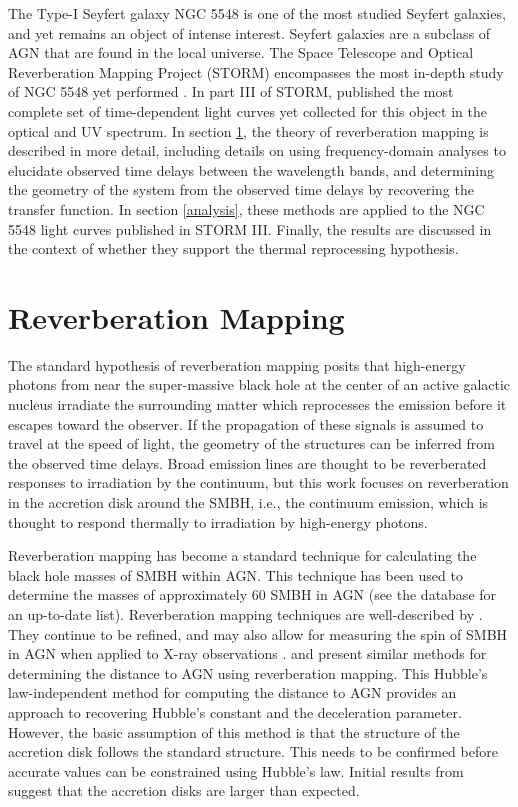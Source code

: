 \documentclass[11pt,letterpaper]{article}
\begin{document}
The Type-I Seyfert galaxy NGC 5548 is one of the most studied Seyfert galaxies, and yet remains an object of intense interest. Seyfert galaxies are a subclass of AGN that are found in the local universe. The Space Telescope and Optical Reverberation Mapping Project (STORM) encompasses the most in-depth study of NGC 5548 yet performed \citep{2015ApJ...806..128D} \citep{2015ApJ...806..129E} \citep{2016ApJ...821...56F}. In part III of STORM, \cite{2016ApJ...821...56F} published the most complete set of time-dependent light curves yet collected for this object in the optical and UV spectrum. In section \ref{sec:reverbmap}, the theory of reverberation mapping is described in more detail, including details on using frequency-domain analyses to elucidate observed time delays between the wavelength bands, and determining the geometry of the system from the observed time delays by recovering the transfer function. In section \ref{analysis}, these methods are applied to the NGC 5548 light curves published in STORM III. Finally, the results are discussed in the context of whether they support the thermal reprocessing hypothesis.


\section{Reverberation Mapping}
\label{sec:reverbmap}

The standard hypothesis of reverberation mapping posits that high-energy photons from near the super-massive black hole at the center of an active galactic nucleus irradiate the surrounding matter which reprocesses the emission before it escapes toward the observer. If the propagation of these signals is assumed to travel at the speed of light, the geometry of the structures can be inferred from the observed time delays. Broad emission lines are thought to be reverberated responses to irradiation by the continuum, but this work focuses on reverberation in the accretion disk around the SMBH, i.e., the continuum emission, which is thought to respond thermally to irradiation by high-energy photons.

Reverberation mapping has become a standard technique for calculating the black hole masses of SMBH within AGN. This technique has been used to determine the masses of approximately 60 SMBH in AGN (see the \cite{2015PASP..127...67B} database for an up-to-date list). Reverberation mapping techniques are well-described by \cite{2014SSRv..183..253P}. They continue to be refined, and may also allow for measuring the spin of SMBH in AGN when applied to X-ray observations \citep{2016Natur.535..388K}. \cite{2007MNRAS.380..669C} and \cite{1999MNRAS.302L..24C} present similar methods for determining the distance to AGN using reverberation mapping. This Hubble's law-independent method for computing the distance to AGN provides an approach to recovering Hubble's constant and the deceleration parameter. However, the basic assumption of this method is that the structure of the accretion disk follows the standard \cite{1973A&A....24..337S} structure. This needs to be confirmed before accurate values can be constrained using Hubble's law. Initial results from \cite{2007MNRAS.380..669C} suggest that the accretion disks are larger than expected.
\end{document}
